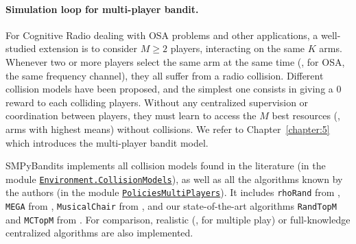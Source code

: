 \paragraph{Simulation loop for multi-player bandit.}

For Cognitive Radio dealing with OSA problems and other applications, a well-studied extension is to consider $M\geq2$ players, interacting on the same $K$ arms.
Whenever two or more players select the same arm at the same time (\eg, for OSA, the same frequency channel), they all suffer from a radio collision.
%
Different collision models have been proposed, and the simplest one consists in giving a $0$ reward to each colliding players.
Without any centralized supervision or coordination between players, they must learn to access the $M$ best resources (\ie, arms with highest means) without collisions.
We refer to Chapter~\ref{chapter:5} which introduces the multi-player bandit model.

SMPyBandits implements all collision models found in the literature (in the module \texttt{\href{https://SMPyBandits.GitHub.io/docs/Environment.CollisionModels.html}{Environment.CollisionModels}}), as well as all the algorithms known by the authors (in the module \texttt{\href{https://SMPyBandits.GitHub.io/docs/PoliciesMultiPlayers.html}{PoliciesMultiPlayers}}).
%
It includes
\texttt{rhoRand}
from \cite{Anandkumar11},
\texttt{MEGA}
from \cite{Avner15},
\texttt{MusicalChair}
from \cite{Rosenski16},
and our state-of-the-art algorithms
\texttt{RandTopM}
and \texttt{MCTopM}
from \cite{Besson2018ALT}.
For comparison, realistic (\eg, \UCB{} for multiple play) or full-knowledge centralized algorithms are also implemented.

